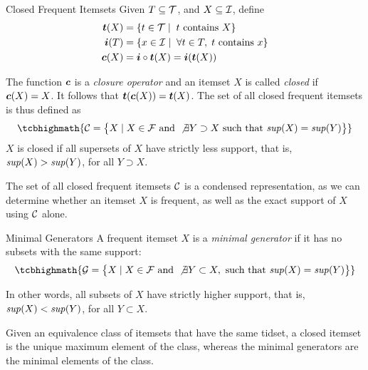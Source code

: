 \begin{frame}{Closed Frequent Itemsets}
  \small
Given $T \subseteq {\mathcal T}$, and $X
\subseteq {\mathcal I}$, define
\begin{align*}
  {{\boldsymbol t}}(X) & = \{ t \in {\mathcal T} \mid\; t \text{ contains } X\}\\
  {{\boldsymbol i}}(T) & = \{ x \in {\mathcal I} \mid\; \forall t\in T, \;t \mbox{ contains } x
  \}\\
   {{\boldsymbol c}}(X) & =  {{\boldsymbol i}} \circ {{\boldsymbol t}} (X) = {{\boldsymbol i}} ( {{\boldsymbol t}} (X))
\end{align*}

\medskip
The function ${{\boldsymbol c}}$ is a {\em closure operator} 
and an itemset $X$ is called {\em closed} if ${{\boldsymbol c}}(X) = X$.
It follows that ${{\boldsymbol t}}({{\boldsymbol c}}(X))={{\boldsymbol t}}(X)$. The
set of all closed frequent itemsets is thus def\/{i}ned as
\begin{align*}
\tcbhighmath{
\cC = \bigl\{X \mid X \in  \cF \text{ and } \not\exists Y \supset X
\text{  such that } \supp(X) = \supp(Y)\bigr\}
}
\end{align*}
$X$ is closed if all supersets of $X$ have strictly less
support, that is, $\mathit{sup}(X) > \mathit{sup}(Y)$, for all $Y \supset X$.

\medskip
The set of all closed frequent itemsets ${\mathcal C}$ is a condensed
representation, as we can determine whether an itemset $X$ is
frequent, as well as the exact support of $X$ using ${\mathcal C}$ alone.
\end{frame}


\begin{frame}{Minimal Generators}
A frequent itemset $X$ is a {\em minimal generator} if
it has no subsets with the same support:
\begin{align*}
\tcbhighmath{
\cG = \bigl\{X \mid X \in  \cF \text{ and } \not\exists Y \subset X,
\text{ such that } \supp(X) = \supp(Y)\bigr\}
}
\end{align*}

  \medskip
In other words, all subsets of $X$
have strictly higher support, that is,
  $\mathit{sup}(X) < \mathit{sup}(Y)$, for all $Y \subset X$.

  \medskip
Given an equivalence class of itemsets that have the
same tidset, a closed itemset is the unique maximum element of the class,
whereas the minimal generators are the minimal elements of the class.
\end{frame}



